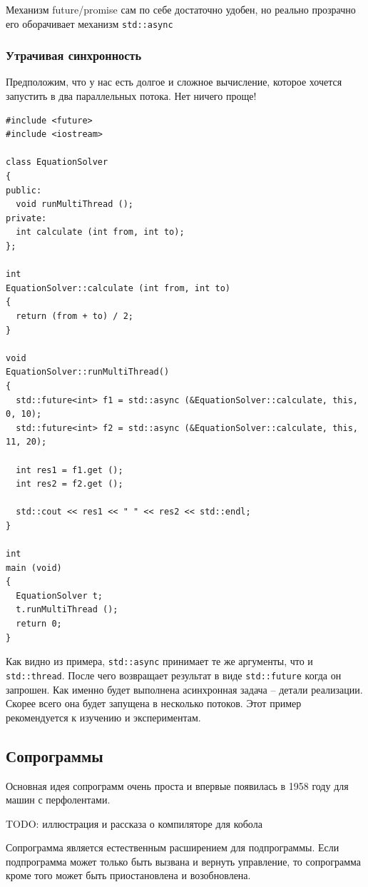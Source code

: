 \documentclass[a4paper,12pt,oneside]{article}
\begin{document}
Механизм future/promise сам по себе достаточно удобен, но реально прозрачно его оборачивает механизм \lstinline!std::async!

\subsubsection{Утрачивая синхронность}

Предположим, что у нас есть долгое и сложное вычисление, которое хочется запустить в два параллельных потока. Нет ничего проще!

\begin{lstlisting}
#include <future>
#include <iostream>

class EquationSolver
{
public:
  void runMultiThread ();
private:
  int calculate (int from, int to);  
};

int 
EquationSolver::calculate (int from, int to)
{
  return (from + to) / 2;
}

void 
EquationSolver::runMultiThread()
{
  std::future<int> f1 = std::async (&EquationSolver::calculate, this,  0, 10);
  std::future<int> f2 = std::async (&EquationSolver::calculate, this, 11, 20);

  int res1 = f1.get ();
  int res2 = f2.get ();

  std::cout << res1 << " " << res2 << std::endl;
}

int
main (void)
{
  EquationSolver t;
  t.runMultiThread ();
  return 0;
}
\end{lstlisting}

Как видно из примера, \lstinline!std::async! принимает те же аргументы, что и \lstinline!std::thread!. После чего возвращает результат в виде \lstinline!std::future! когда он запрошен. Как именно будет выполнена асинхронная задача -- детали реализации. Скорее всего она будет запущена в несколько потоков.
Этот пример рекомендуется к изучению и экспериментам.

\pagebreak
\subsection{Сопрограммы}\label{NewCoroutines}

Основная идея сопрограмм очень проста и впервые появилась в 1958 году для машин с перфолентами.

TODO: иллюстрация и рассказа о компиляторе для кобола

Сопрограмма является естественным расширением для подпрограммы. Если подпрограмма может только быть вызвана и вернуть управление, то сопрограмма кроме того может быть приостановлена и возобновлена.
\end{document}
